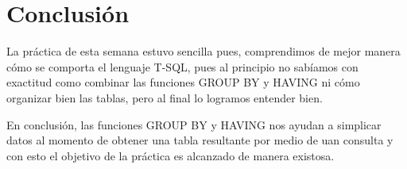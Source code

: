 \documentclass[12pt, letterpaper]{article}
\begin{document}
    \section*{Conclusión}
    La práctica de esta semana estuvo sencilla pues, comprendimos de mejor manera cómo se comporta el lenguaje
    T-SQL, pues al principio no sabíamos con exactitud como combinar las funciones GROUP BY y HAVING ni cómo organizar bien las tablas,
    pero al final lo logramos entender bien. \vspace{.3cm}

    En conclusión, las funciones GROUP BY y HAVING nos ayudan a simplicar datos al momento de obtener una tabla resultante
    por medio de uan consulta y con esto el objetivo de la práctica es alcanzado de manera existosa.
\end{document}
